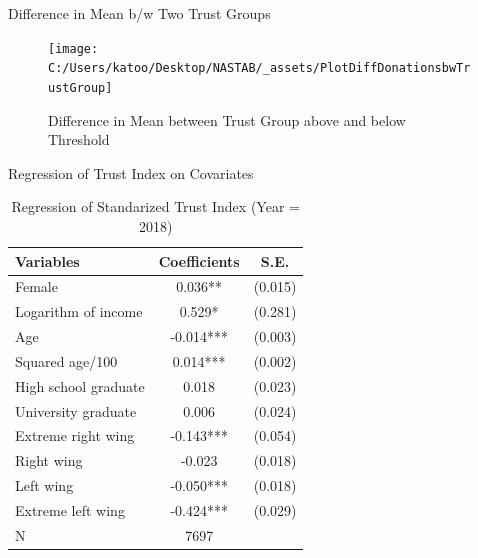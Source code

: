 \documentclass[
  ignorenonframetext,
]{beamer}
\begin{document}
\begin{frame}{Difference in Mean b/w Two Trust Groups}
\protect\hypertarget{difference-in-mean-bw-two-trust-groups}{}
\begin{figure}
\texttt{[image: C:/Users/katoo/Desktop/NASTAB/\_assets/PlotDiffDonationsbwTrustGroup]} \caption{Difference in Mean between Trust Group above and below Threshold}\label{fig:unnamed-chunk-5}
\end{figure}
\end{frame}

\begin{frame}{Regression of Trust Index on Covariates}
\protect\hypertarget{regression-of-trust-index-on-covariates}{}
\begin{table}

\caption{\label{tab:kableRegTrustidOnCovariate}Regression of Standarized Trust Index (Year = 2018)}
\centering
\begin{tabular}[t]{lcc}
\toprule
Variables & Coefficients & S.E.\\
\midrule
Female & 0.036** & (0.015)\\
Logarithm of income & 0.529* & (0.281)\\
Age & -0.014*** & (0.003)\\
Squared age/100 & 0.014*** & (0.002)\\
High school graduate & 0.018 & (0.023)\\
University graduate & 0.006 & (0.024)\\
Extreme right wing & -0.143*** & (0.054)\\
Right wing & -0.023 & (0.018)\\
Left wing & -0.050*** & (0.018)\\
Extreme left wing & -0.424*** & (0.029)\\
N & 7697 & \\
\bottomrule
\end{tabular}
\end{table}
\end{frame}
\end{document}
